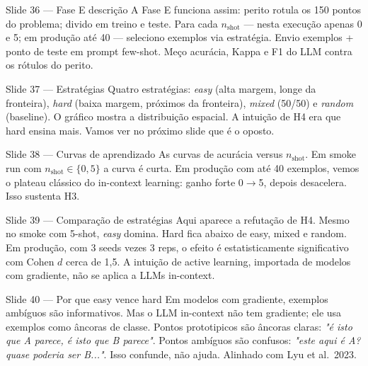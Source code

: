 \documentclass[aspectratio=169,10pt]{beamer}
\begin{document}
\begin{frame}{Slide 36 --- Fase E descri\c{c}\~ao}
\footnotesize
A Fase E funciona assim: perito rotula os 150 pontos do problema; divido em treino e teste. Para cada $n_{\text{shot}}$ --- nesta execu\c{c}\~ao apenas 0 e 5; em produ\c{c}\~ao at\'e 40 --- seleciono exemplos via estrat\'egia. Envio exemplos + ponto de teste em prompt few-shot. Me\c{c}o acur\'acia, Kappa e F1 do LLM contra os r\'otulos do perito.
\end{frame}

\begin{frame}{Slide 37 --- Estrat\'egias}
\footnotesize
Quatro estrat\'egias: \emph{easy} (alta margem, longe da fronteira), \emph{hard} (baixa margem, pr\'oximos da fronteira), \emph{mixed} (50/50) e \emph{random} (baseline). O gr\'afico mostra a distribui\c{c}\~ao espacial. A intui\c{c}\~ao de H4 era que hard ensina mais. Vamos ver no pr\'oximo slide que \'e o oposto.
\end{frame}

\begin{frame}{Slide 38 --- Curvas de aprendizado}
\footnotesize
As curvas de acur\'acia versus $n_{\text{shot}}$. Em smoke run com $n_{\text{shot}}\in\{0, 5\}$ a curva \'e curta. Em produ\c{c}\~ao com at\'e 40 exemplos, vemos o plateau cl\'assico do in-context learning: ganho forte 0$\to$5, depois desacelera. Isso sustenta H3.
\end{frame}

\begin{frame}{Slide 39 --- Compara\c{c}\~ao de estrat\'egias}
\footnotesize
Aqui aparece a refuta\c{c}\~ao de H4. Mesmo no smoke com 5-shot, \emph{easy} domina. Hard fica abaixo de easy, mixed e random. Em produ\c{c}\~ao, com 3 seeds vezes 3 reps, o efeito \'e estatisticamente significativo com Cohen $d$ cerca de 1{,}5. A intui\c{c}\~ao de active learning, importada de modelos com gradiente, n\~ao se aplica a LLMs in-context.
\end{frame}

\begin{frame}{Slide 40 --- Por que easy vence hard}
\footnotesize
Em modelos com gradiente, exemplos amb\'iguos s\~ao informativos. Mas o LLM in-context n\~ao tem gradiente; ele usa exemplos como \^ancoras de classe. Pontos prototipicos s\~ao \^ancoras claras: \emph{"\'e isto que A parece, \'e isto que B parece"}. Pontos amb\'iguos s\~ao confusos: \emph{"este aqui \'e A? quase poderia ser B..."}. Isso confunde, n\~ao ajuda. Alinhado com Lyu et al.\ 2023.
\end{frame}
\end{document}
